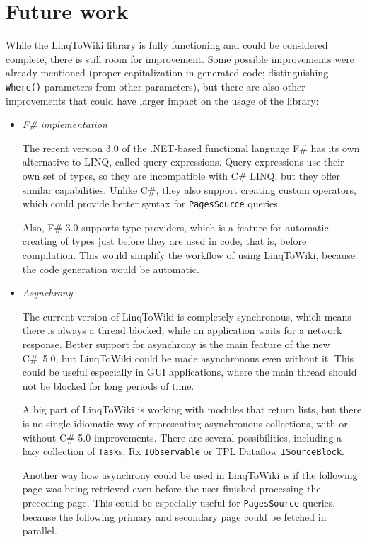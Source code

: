 \chapter{Future work}
\label{future work}


While the LinqToWiki library is fully functioning and could be considered complete,
there is still room for improvement.
Some possible improvements were already mentioned
(proper capitalization in generated code;
distinguishing \lstinline{Where()} parameters from other parameters),
but there are also other improvements that could have larger impact on the usage of the library:

\begin{itemize}
\item \emph{F\# implementation}

The recent version 3.0 of the .NET-based functional language F\# has its own alternative to \ac{LINQ},
called query expressions.
Query expressions use their own set of types, so they are incompatible with C\# \ac{LINQ},
but they offer similar capabilities.
Unlike C\#, they also support creating custom operators,
which could provide better syntax for \lstinline{PagesSource} queries.

Also, F\# 3.0 supports type providers, which is a feature for automatic creating of types
just before they are used in code, that is, before compilation.
This would simplify the workflow of using LinqToWiki, because the code generation would be automatic.

\item \emph{Asynchrony}

The current version of LinqToWiki is completely synchronous,
which means there is always a thread blocked, while an application waits for a network response.
Better support for asynchrony is the main feature of the new C\#~5.0,
but LinqToWiki could be made asynchronous even without it.
This could be useful especially in \ac{GUI} applications, where the main thread should not be blocked for long periods of time.

A big part of LinqToWiki is working with modules that return lists,
but there is no single idiomatic way of representing asynchronous collections,
with or without C\# 5.0 improvements.
There are several possibilities, including a lazy collection of \lstinline{Task}s,
\acs{Rx} \lstinline{IObservable} or \acs{TPL} Dataflow \lstinline{ISourceBlock}.

Another way how asynchrony could be used in LinqToWiki is if the following page was being retrieved
even before the user finished processing the preceding page.
This could be especially useful for \lstinline{PagesSource} queries,
because the following primary and secondary page could be fetched in parallel.


\end{itemize}

